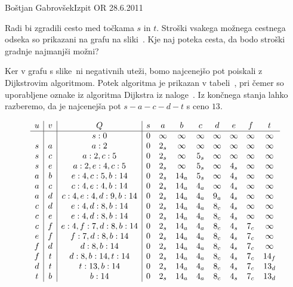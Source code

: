 \begin{naloga}{Boštjan Gabrovšek}{Izpit OR 28.6.2011}
\begin{vprasanje}
Radi bi zgradili cesto med točkama $s$ in $t$.
Stroški vsakega možnega cestnega odseka
so prikazani na grafu na sliki~\fig.
Kje naj poteka cesta, da bodo stroški gradnje najmanjši možni?

\begin{slika}
\pgfslika
{}
\end{slika}
\end{vprasanje}

\begin{odgovor}
Ker v grafu s slike~\fig ni negativnih uteži,
bomo najcenejšo pot poiskali z Dijkstrovim algoritmom.
Potek algoritma je prikazan v tabeli~\tab,
pri čemer so uporabljene oznake
iz algoritma {\sc Dijkstra} iz naloge~\res[dijkstra].
Iz končnega stanja lahko razberemo,
da je najcenejša pot $s - a - c - d - t$ s ceno $13$.
%
\begin{tabela}
$$
\begin{array}{c|c|c|cccccccc}
u & v & Q & s & a & b & c & d & e & f & t \\ \hline
  &   & s: 0 & 0 & \infty & \infty & \infty & \infty & \infty & \infty & \infty \\
s & a & a: 2 & 0 & 2_s & \infty & \infty & \infty & \infty & \infty & \infty \\
s & c & a: 2, c: 5 & 0 & 2_s & \infty & 5_s & \infty & \infty & \infty & \infty \\
s & e & a: 2, e: 4, c: 5 & 0 & 2_s & \infty & 5_s & \infty & 4_s & \infty & \infty \\
a & b & e: 4, c: 5, b: 14 & 0 & 2_s & 14_a & 5_s & \infty & 4_s & \infty & \infty \\
a & c & c: 4, e: 4, b: 14 & 0 & 2_s & 14_a & 4_a & \infty & 4_s & \infty & \infty \\
a & d & c: 4, e: 4, d: 9, b: 14 & 0 & 2_s & 14_a & 4_a & 9_a & 4_s & \infty & \infty \\
c & d & e: 4, d: 8, b: 14 & 0 & 2_s & 14_a & 4_a & 8_c & 4_s & \infty & \infty \\
c & e & e: 4, d: 8, b: 14 & 0 & 2_s & 14_a & 4_a & 8_c & 4_s & \infty & \infty \\
c & f & e: 4, f: 7, d: 8, b: 14 & 0 & 2_s & 14_a & 4_a & 8_c & 4_s & 7_c & \infty \\
e & f & f: 7, d: 8, b: 14 & 0 & 2_s & 14_a & 4_a & 8_c & 4_s & 7_c & \infty \\
f & d & d: 8, b: 14 & 0 & 2_s & 14_a & 4_a & 8_c & 4_s & 7_c & \infty \\
f & t & d: 8, b: 14, t: 14 & 0 & 2_s & 14_a & 4_a & 8_c & 4_s & 7_c & 14_f \\
d & t & t: 13, b: 14 & 0 & 2_s & 14_a & 4_a & 8_c & 4_s & 7_c & 13_d \\
t & b & b: 14 & 0 & 2_s & 14_a & 4_a & 8_c & 4_s & 7_c & 13_d \\
\end{array}
$$
\end{tabela}
\end{odgovor}
\end{naloga}
